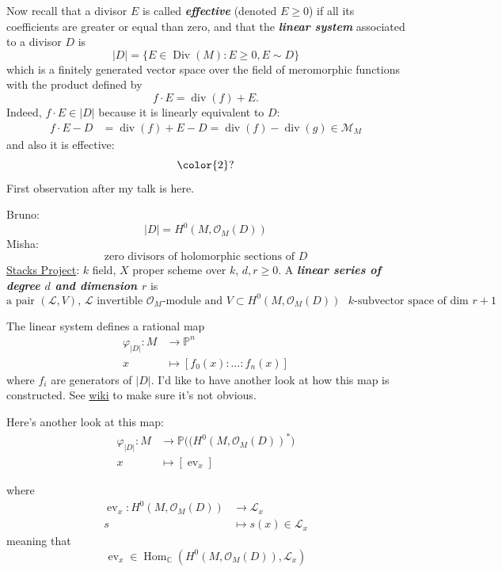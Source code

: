 Now recall that a divisor $E$ is called \textit{\textbf{effective}} (denoted $E\geq 0$) if all its coefficients are greater or equal than zero, and that the \textit{\textbf{linear system}} associated to a divisor  $D$ is
 \[|D| =\{E\in\operatorname{Div}(M):E\geq 0, E\sim D\}\]
 which is a finitely generated vector space over the field of meromorphic functions with the product defined by
 \[f\cdot E=\operatorname{div}(f)+E.\]
 Indeed, $f\cdot E\in |D|$ because it is linearly equivalent to $D$:
  \begin{align*}
  f\cdot E-D&=\operatorname{div}(f)+E-D=\operatorname{div}(f)-\operatorname{div}(g)\in\mathcal{M}_M
  \end{align*}
and also it is effective:
\[{\color{2}?}\]
{\color{3}First observation after my talk is here.}
\begin{defn}[Linear system=Linear series]\leavevmode
	Bruno:
	\[|D|=H^{0}(M,\mathcal{O}_M(D))\]
	Misha:
	\[\text{zero divisors of holomorphic sections of $D$} \]
	\href{https://stacks.math.columbia.edu/tag/0CCM}{Stacks Project}: $k$ field, $X$ proper scheme over $k$, $d,r\geq 0$. A \textit{\textbf{linear series of degree $d$ and dimension $r$}} is
	\[\text{a pair $(\mathcal{L},V)$, $\mathcal{L}$ invertible $\mathcal{O}_M$-module and $V\subset H^{0}(M,\mathcal{O}_M(D))$ $k$-subvector space of dim $r+1$} \]
\end{defn}

The linear system defines a rational map
\begin{align*}
	\varphi_{|D|}: M &\longrightarrow \mathbb{P}^{n} \\
	x &\longmapsto [f_0(x):\ldots :f_n(x)]
\end{align*}
where $f_i$ are generators of $|D|$. {\color{3}I'd like to have another look at how this map is constructed. See \href{https://en.wikipedia.org/wiki/Linear_system_of_divisors#A_map_determined_by_a_linear_system}{wiki} to make sure it's not obvious.}

Here's another look at this map:
\begin{align*}
	\varphi_{|D|}:M&\longrightarrow \mathbb{P}\big((H^{0}(M,\mathcal{O}_M(D))^*\big) \\
	x &\longmapsto [\operatorname{ev}_x]
\end{align*}

where
\begin{align*}
	\operatorname{ev}_x: H^{0}(M,\mathcal{O}_M(D)) &\longrightarrow \mathcal{L}_x \\
	s &\longmapsto s(x)\in\mathcal{L}_x
\end{align*}
meaning that
\[\operatorname{ev}_x\in\operatorname{Hom}_\mathbb{C}(H^{0}(M,\mathcal{O}_M(D)),\mathcal{L}_x)\]


